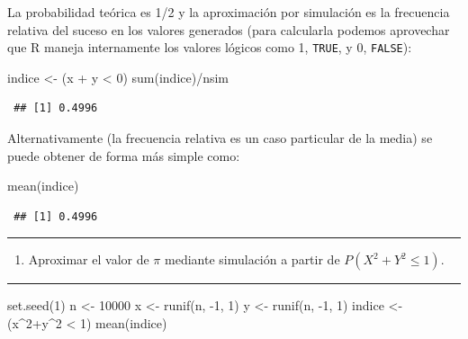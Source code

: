 \documentclass[
]{book}
\newenvironment{Shaded}{\begin{snugshade}}{\end{snugshade}}
\newcommand{\DecValTok}[1]{\textcolor[rgb]{0.00,0.00,0.81}{#1}}
\newcommand{\FunctionTok}[1]{\textcolor[rgb]{0.00,0.00,0.00}{#1}}
\newcommand{\NormalTok}[1]{#1}
\newcommand{\OtherTok}[1]{\textcolor[rgb]{0.56,0.35,0.01}{#1}}
\newcommand{\SpecialCharTok}[1]{\textcolor[rgb]{0.00,0.00,0.00}{#1}}
\providecommand{\tightlist}{%
  \setlength{\itemsep}{0pt}\setlength{\parskip}{0pt}}
\theoremstyle{break}
\theoremstyle{nonumberplain}
\begin{document}
La probabilidad teórica es 1/2 y la aproximación por simulación es la frecuencia relativa del suceso en los valores generados (para calcularla podemos aprovechar que R maneja internamente los valores lógicos como 1, \texttt{TRUE}, y 0, \texttt{FALSE}):

\begin{Shaded}
\begin{Highlighting}[]
\NormalTok{indice }\OtherTok{\textless{}{-}}\NormalTok{ (x }\SpecialCharTok{+}\NormalTok{ y }\SpecialCharTok{\textless{}} \DecValTok{0}\NormalTok{)}
\FunctionTok{sum}\NormalTok{(indice)}\SpecialCharTok{/}\NormalTok{nsim}
\end{Highlighting}
\end{Shaded}

\begin{verbatim}
 ## [1] 0.4996
\end{verbatim}

Alternativamente (la frecuencia relativa es un caso particular de la media) se puede obtener de forma más simple como:

\begin{Shaded}
\begin{Highlighting}[]
\FunctionTok{mean}\NormalTok{(indice)}
\end{Highlighting}
\end{Shaded}

\begin{verbatim}
 ## [1] 0.4996
\end{verbatim}

\begin{center}\rule{0.5\linewidth}{0.5pt}\end{center}

\begin{enumerate}
\def\labelenumi{\alph{enumi})}
\setcounter{enumi}{1}
\tightlist
\item
  Aproximar el valor de \(\pi\) mediante simulación a partir de
  \(P\left( X^2 +Y^2 \leq 1 \right)\).
\end{enumerate}

\begin{center}\rule{0.5\linewidth}{0.5pt}\end{center}

\begin{Shaded}
\begin{Highlighting}[]
\FunctionTok{set.seed}\NormalTok{(}\DecValTok{1}\NormalTok{)}
\NormalTok{n }\OtherTok{\textless{}{-}} \DecValTok{10000}
\NormalTok{x }\OtherTok{\textless{}{-}} \FunctionTok{runif}\NormalTok{(n, }\SpecialCharTok{{-}}\DecValTok{1}\NormalTok{, }\DecValTok{1}\NormalTok{)}
\NormalTok{y }\OtherTok{\textless{}{-}} \FunctionTok{runif}\NormalTok{(n, }\SpecialCharTok{{-}}\DecValTok{1}\NormalTok{, }\DecValTok{1}\NormalTok{)}
\NormalTok{indice }\OtherTok{\textless{}{-}}\NormalTok{ (x}\SpecialCharTok{\^{}}\DecValTok{2}\SpecialCharTok{+}\NormalTok{y}\SpecialCharTok{\^{}}\DecValTok{2} \SpecialCharTok{\textless{}} \DecValTok{1}\NormalTok{)}
\FunctionTok{mean}\NormalTok{(indice)}
\end{Highlighting}
\end{Shaded}
\end{document}

